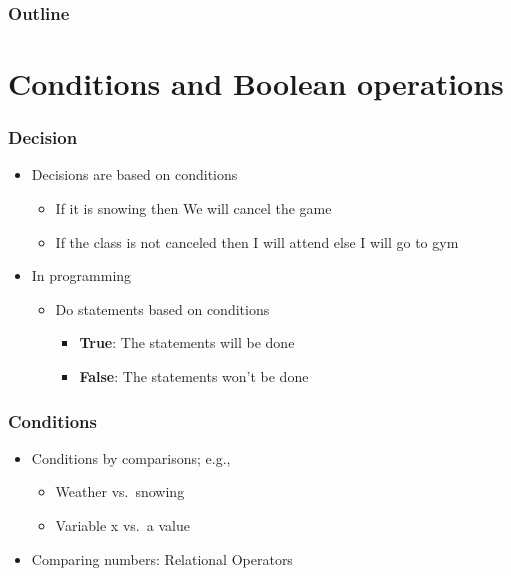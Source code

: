 \documentclass{../c-lecture}
\subtitle{Making Decisions}
\begin{document}
\begin{frame}
  \titlepage{}
\end{frame}
\begin{frame}
  \frametitle{Outline}
  \tableofcontents{}
\end{frame}

\section{Conditions and Boolean operations}

\begin{frame}
  \frametitle{Decision}
  \begin{itemize}
    \item Decisions are based on conditions
    \begin{itemize}
      \item If it is snowing
        then We will cancel the game
      \item If the class is not canceled
        then I will attend
        else I will go to gym
    \end{itemize}
    \item In programming
    \begin{itemize}
      \item Do statements based on conditions
      \begin{itemize}
        \item \textbf{\color{LimeGreen} True}: The statements will be done
        \item \textbf{\color{RubineRed} False}: The statements won't be done
      \end{itemize}
    \end{itemize}
  \end{itemize}
\end{frame}

\begin{frame}
  \frametitle{Conditions}
  \begin{itemize}
    \item Conditions by comparisons; e.g.,
    \begin{itemize}
      \item Weather vs.\ snowing
      \item Variable x vs.\ a value
    \end{itemize}
    \item Comparing numbers: Relational Operators
  \end{itemize}
\end{frame}
\end{document}
